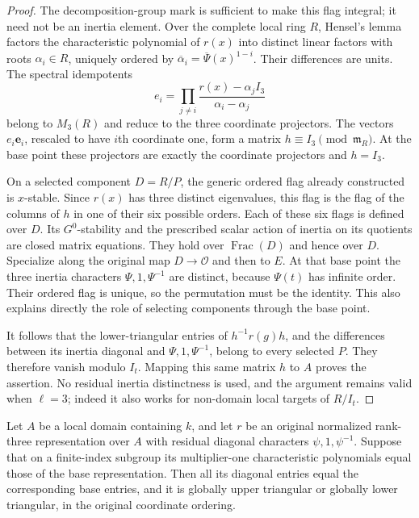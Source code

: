 \begin{proof}
The decomposition-group mark is sufficient to make this flag
integral; it need not be an inertia element.  Over the complete local
ring $R$, Hensel's lemma factors the characteristic polynomial of
$r(x)$ into distinct linear factors with roots $\alpha_i\in R$,
uniquely ordered by
$\overline\alpha_i=\overline\Psi(x)^{1-i}$.  Their differences are
units.  The spectral idempotents
\[
 e_i=\prod_{j\ne i}
               \frac{r(x)-\alpha_j I_3}{\alpha_i-\alpha_j}
                                                               \tag{IF3}
\]
belong to $M_3(R)$ and reduce to the three coordinate projectors.
The vectors $e_i\mathbf e_i$, rescaled to have $i$th coordinate one,
form a matrix $h\equiv I_3\pmod{\mathfrak m_R}$.  At the base point
these projectors are exactly the coordinate projectors and $h=I_3$.

On a selected component $D=R/P$, the generic ordered flag already
constructed is $x$-stable.  Since $r(x)$ has three distinct
eigenvalues, this flag is the flag of the columns of $h$ in one
of their six possible orders.  Each of these six flags is defined
over $D$.  Its $G^0$-stability and the prescribed scalar action of
inertia on its quotients are closed matrix equations.  They hold
over $\operatorname{Frac}(D)$ and hence over $D$.  Specialize along
the original map $D\to\mathcal O$ and then to $E$.  At that base
point the three inertia characters $\Psi,1,\Psi^{-1}$ are distinct,
because $\Psi(t)$ has infinite order.  Their ordered flag is unique,
so the permutation must be the identity.  This also explains
directly the role of selecting components through the base point.

It follows that the lower-triangular entries of $h^{-1}r(g)h$, and
the differences between its inertia diagonal and
$\Psi,1,\Psi^{-1}$, belong to every selected $P$.  They therefore
vanish modulo $I_t$.  Mapping this same matrix $h$ to $A$ proves
the assertion.  No residual inertia distinctness is used, and the
argument remains valid when $\ell=3$; indeed it also works for
non-domain local targets of $R/I_t$.
\end{proof}

\begin{lemma}
\label{lem:support-integral-global-triangularity}
Let $A$ be a local domain containing $k$, and let $r$ be an original
normalized rank-three representation over $A$ with residual diagonal
characters $\psi,1,\psi^{-1}$.  Suppose that on a finite-index subgroup
its multiplier-one characteristic polynomials equal those of the base
representation.  Then all its diagonal entries equal the corresponding
base entries, and it is globally upper triangular or globally lower
triangular, in the original coordinate ordering.
\end{lemma}

